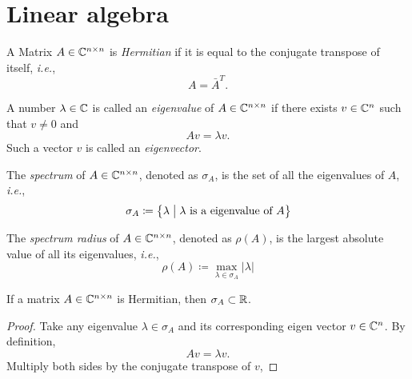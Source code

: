 \section{Linear algebra}




\begin{definition}
A Matrix \(A\in\mathbb{C}^{n\times n}\) is \emph{Hermitian} if it is equal to the conjugate transpose of itself, \textit{i.e.},
\begin{equation}
A=\bar{A}^T.
\end{equation}
\end{definition}


\begin{definition}
A number \(\lambda\in\mathbb{C}\) is called an \emph{eigenvalue} of \(A\in\mathbb{C}^{n\times n}\) if there exists \(v\in\mathbb{C}^n\) such that \(v\neq0\) and
\begin{equation}
Av=\lambda v.
\end{equation}
Such a vector $v$ is called an \emph{eigenvector}.
\end{definition}


\begin{definition}[Spectrum]
The \emph{spectrum} of \(A\in\mathbb{C}^{n\times n}\), denoted as \(\sigma_A\), is the set of all the eigenvalues of $A$, \textit{i.e.},
\begin{equation}
\sigma_A\coloneqq\Set{\lambda}{\lambda \text{ is a eigenvalue of }A}
\end{equation}
\end{definition}


\begin{definition}
The \emph{spectrum radius} of \(A\in\mathbb{C}^{n\times n}\), denoted as \(\rho(A)\), is the largest absolute value of all its eigenvalues, \textit{i.e.},
\begin{equation}
\rho(A)\coloneqq\max_{\lambda\in\sigma_A}|\lambda|
\end{equation}
\end{definition}


\begin{theorem}
If a matrix \(A\in\mathbb{C}^{n\times n}\) is Hermitian, then \(\sigma_A\subset\mathbb{R}\).
\end{theorem}
\begin{proof}
Take any eigenvalue \(\lambda\in\sigma_A\) and its corresponding eigen vector \(v\in\mathbb{C}^n\).
By definition,
\begin{equation}
	Av=\lambda v.
\end{equation}
Multiply both sides by the conjugate transpose of $v$,

\end{proof}
